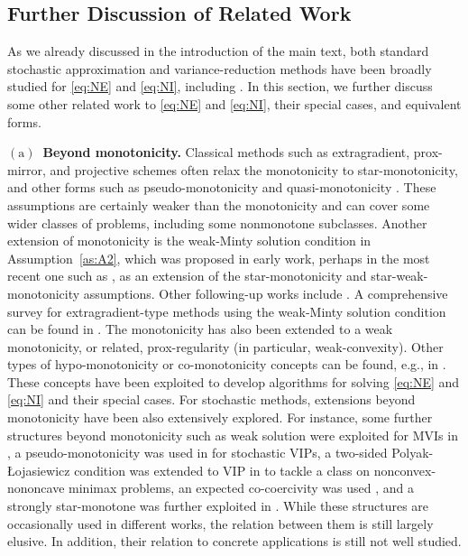 \documentclass{article}
\newcommand{\beforesubsec}{\vspace{-1.5ex}}
\newcommand{\aftersubsec}{\vspace{-1.5ex}}
\theoremstyle{plain}
\theoremstyle{definition}
\theoremstyle{remark}
\begin{document}
\beforesubsec
\subsection{Further Discussion of Related Work}\label{apdix:subsec:further_related_work}
\aftersubsec
As we already discussed in the introduction of the main text, both standard stochastic approximation and variance-reduction methods have been broadly studied for \eqref{eq:NE} and \eqref{eq:NI}, including \citep{juditsky2011solving,kotsalis2022simple,pethick2023solving}.
In this section, we further discuss some other related work to \eqref{eq:NE} and \eqref{eq:NI}, their special cases, and equivalent forms.

\noindent\textbf{$\mathrm{(a)}$~Beyond monotonicity.}
Classical  methods such as extragradient, prox-mirror, and projective schemes often relax the monotonicity to star-monotonicity, and other forms such as pseudo-monotonicity and quasi-monotonicity \citep{Konnov2001,noor2003extragradient,noor1999wiener,vuong2018weak}.
These assumptions are certainly weaker than the monotonicity and can cover some wider classes of problems, including some nonmonotone subclasses. 
Another extension of monotonicity is the weak-Minty solution condition in Assumption~\ref{as:A2}, which was proposed in early work, perhaps in the most recent one such as  \citep{diakonikolas2021efficient}, as an extension of the star-monotonicity and star-weak-monotonicity assumptions. 
Other following-up works include \citep{bohm2022solving,gorbunov2022extragradient,luo2022last}.
A comprehensive survey for extragradient-type methods using the weak-Minty solution condition can be found in \citep{tran2023sublinear,TranDinh2025a,tran2025accelerated}.
The monotonicity has also been extended to a weak monotonicity, or related, prox-regularity \citep{Rockafellar1997} (in particular, weak-convexity).
Other types of  hypo-monotonicity or co-monotonicity concepts can be found, e.g., in \citep{bauschke2020generalized}.
These concepts have been exploited to develop algorithms for solving  \eqref{eq:NE} and \eqref{eq:NI} and their special cases.
For stochastic methods, extensions beyond monotonicity have been also extensively explored.
For instance, some further structures beyond monotonicity such as weak solution were exploited for MVIs in \citep{song2020optimistic}, a pseudo-monotonicity was used in  \citep{boct2021minibatch,kannan2019optimal} for stochastic VIPs, a two-sided Polyak-{\L}ojasiewicz condition was extended to VIP in  \citep{yang2020global} to tackle a class on nonconvex-nononcave minimax problems, an expected co-coercivity was used \citep{loizou2021stochastic}, and a strongly star-monotone was further exploited in \citep{gorbunov2022stochastic}.
While these structures are occasionally used in different works, the relation between them is still largely elusive. 
In addition, their relation to concrete applications is still not well studied.
\end{document}
